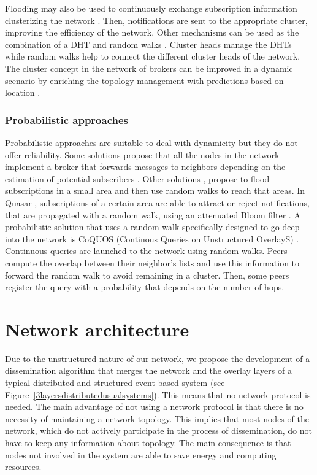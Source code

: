 \documentclass[conference]{IEEEtran}
\begin{document}
Flooding may also be used to continuously exchange subscription information clusterizing the network \cite{Voulgaris06}. Then, notifications are sent to the appropriate cluster, improving the efficiency of the network. Other mechanisms can be used as the combination of a DHT and random walks \cite{Tian:2005}. Cluster heads manage the DHTs while random walks help to connect the different cluster heads of the network. The cluster concept in the network of brokers can be improved in a dynamic scenario by enriching the topology management with predictions based on location \cite{Abdennadher:2013:APM:2508222.2508234}. 

\subsubsection{Probabilistic approaches}
Probabilistic approaches are suitable to deal with dynamicity but they do not offer reliability. Some solutions propose that all the nodes in the network implement a broker that forwards messages to neighbors depending on the estimation of potential subscribers \cite{Haillot:2008}. Other solutions \cite{1437119}, propose to flood subscriptions in a small area and then use random walks to reach that areas. In Quasar \cite{Wong:2008}, subscriptions of a certain area are able to attract or reject notifications, that are propagated with a random walk, using an attenuated Bloom filter \cite{5751342}. A probabilistic solution that uses a random walk specifically designed to go deep into the network is CoQUOS (Continous Queries on Unstructured OverlayS) \cite{Ramaswamy:2011}. Continuous queries are launched to the network using random walks. Peers compute the overlap between their neighbor's lists and use this information to forward the random walk to avoid remaining in a cluster. Then, some peers register the query with a probability that depends on the number of hops.















\vspace{0.5em}
\section{Network architecture}
\label{sec:methodology}

Due to the unstructured nature of our network, we propose the development of a dissemination algorithm that merges the network and the overlay layers of a typical distributed and structured event-based system (see Figure~\ref{3layersdistributedusualsystems}). This means that no network protocol is needed. The main advantage of not using a network protocol is that there is no necessity of maintaining a network topology. This implies that most nodes of the network, which do not actively participate in the process of dissemination, do not have to keep any information about topology. The main consequence is that nodes not involved in the system are able to save energy and computing resources. 
\end{document}
